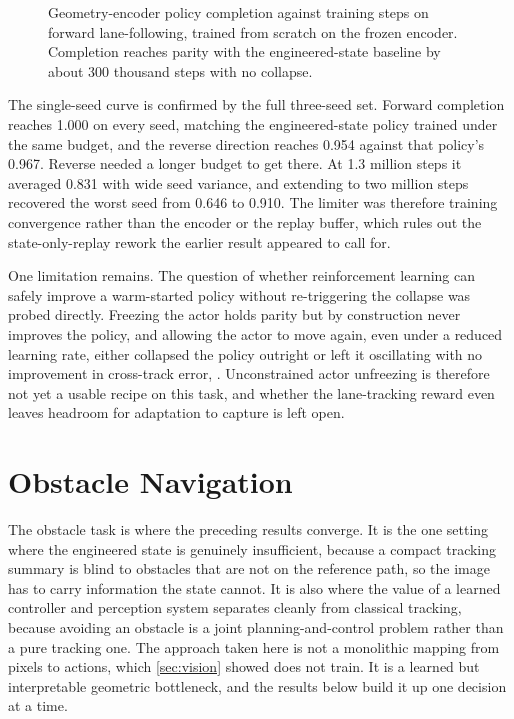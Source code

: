 \begin{figure}[H]
    \centering
    \caption{Geometry-encoder policy completion against training steps on forward lane-following, trained from scratch on the frozen encoder. Completion reaches parity with the engineered-state baseline by about 300 thousand steps with no collapse.}
    \label{fig:geometry_rl_curve}
\end{figure}

The single-seed curve is confirmed by the full three-seed set. Forward completion reaches 1.000 on every seed, matching the engineered-state policy trained under the same budget, and the reverse direction reaches 0.954 against that policy's 0.967. Reverse needed a longer budget to get there. At 1.3 million steps it averaged 0.831 with wide seed variance, and extending to two million steps recovered the worst seed from 0.646 to 0.910. The limiter was therefore training convergence rather than the encoder or the replay buffer, which rules out the state-only-replay rework the earlier result appeared to call for.

One limitation remains. The question of whether reinforcement learning can safely improve a warm-started policy without re-triggering the collapse was probed directly. Freezing the actor holds parity but by construction never improves the policy, and allowing the actor to move again, even under a reduced learning rate, either collapsed the policy outright or left it oscillating with no improvement in cross-track error, . Unconstrained actor unfreezing is therefore not yet a usable recipe on this task, and whether the lane-tracking reward even leaves headroom for adaptation to capture is left open.

\section{Obstacle Navigation}
\label{sec:obstacle_results}

The obstacle task is where the preceding results converge. It is the one setting where the engineered state is genuinely insufficient, because a compact tracking summary is blind to obstacles that are not on the reference path, so the image has to carry information the state cannot. It is also where the value of a learned controller and perception system separates cleanly from classical tracking, because avoiding an obstacle is a joint planning-and-control problem rather than a pure tracking one. The approach taken here is not a monolithic mapping from pixels to actions, which \cref{sec:vision} showed does not train. It is a learned but interpretable geometric bottleneck, and the results below build it up one decision at a time.

